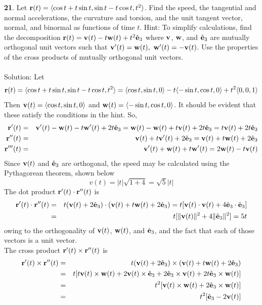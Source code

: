 \documentclass[12pt]{amsbook}
\newcommand{\la}{\langle}
\newcommand{\ra}{\rangle}
\begin{document}
{\small\bf 21}. Let ${\bf r}(t)=\la \cos t+t\sin t,\sin t-t\cos t, t^2 \ra$. Find the speed, the tangential and normal accelerations, the curvature and torsion, and the unit tangent
vector, normal, and binormal as functions of time $t$.
Hint: To simplify calculations, find the decomposition ${\bf r}(t)={\bf v}(t)-t{\bf w}(t)+t^2\hat{\bf e}_3$ where $\bf v$, $\bf w$, and $\hat{\bf e}_3$ are mutually orthogonal unit vectors such that ${\bf v}'(t)={\bf w}(t), \ {\bf w}'(t)=-{\bf v}(t)$. Use the properties of the cross products of mutually orthogonal unit vectors.
\\
\\
{\sc Solution}: Let 
$${\bf r}(t)=\la \cos t+t\sin t,\sin t-t\cos t, t^2 \ra=\la \cos t, \sin t, 0 \ra-t\la -\sin t, \cos t,0 \ra +t^2\la 0,0,1 \ra$$
Then ${\bf v}(t)=\la \cos t, \sin t, 0 \ra$ and ${\bf w}(t)=\la -\sin t, \cos t,0 \ra $. It should be evident that these satisfy the conditions in the hint. So,
\begin{eqnarray*}
{\bf r}'(t)&=&{\bf v}'(t)-{\bf w}(t)-t{\bf w}'(t)+2t\hat{\bf e}_3={\bf w}(t)-{\bf w}(t)+t{\bf v}(t)+2t\hat{\bf e}_3=t{\bf v}(t)+2t\hat{\bf e}_3 \\
{\bf r}''(t)&=&{\bf v}(t)+t{\bf v}'(t)+2\hat{\bf e}_3 ={\bf v}(t)+t{\bf w}(t)+2\hat{\bf e}_3 \\
{\bf r}'''(t)&=&{\bf v}'(t)+{\bf w}(t)+t{\bf w}'(t)=2{\bf w}(t)-t{\bf v}(t)
\end{eqnarray*}
Since ${\bf v}(t)$ and $\hat{\bf e}_3$ are orthogonal, the speed may be calculated using the Pythagorean theorem, shown below
$$v(t)=|t|\sqrt{1+4}=\sqrt{5}|t|$$
The dot product ${\bf r}'(t)\cdot{\bf r}''(t)$ is
\begin{eqnarray*}
{\bf r}'(t)\cdot{\bf r}''(t)&=&t({\bf v}(t)+2\hat{\bf e}_3)\cdot({\bf v}(t)+t{\bf w}(t)+2\hat{\bf e}_3)=t[{\bf v}(t)\cdot{\bf v}(t)+4\hat{\bf e}_3\cdot \hat{\bf e}_3]\\
&=&t[\|{\bf v}(t)\|^2+4\|\hat{\bf e}_3\|^2]=5t
\end{eqnarray*}
owing to the orthogonality of ${\bf v}(t)$, ${\bf w}(t)$, and $\hat{\bf e}_3$, and the fact that each of those vectors is a unit vector. 
\\
The cross product ${\bf r}'(t)\times{\bf r}''(t)$ is
\begin{eqnarray*}
{\bf r}'(t)\times{\bf r}''(t)&=&t({\bf v}(t)+2\hat{\bf e}_3)\times({\bf v}(t)+t{\bf w}(t)+2\hat{\bf e}_3)\\
&=&t[t{\bf v}(t)\times{\bf w}(t)+2{\bf v}(t)\times\hat{\bf e}_3+2\hat{\bf e}_3\times{\bf v}(t)+2t\hat{\bf e}_3\times{\bf w}(t)]\\
&=&t^2[{\bf v}(t)\times{\bf w}(t)+2\hat{\bf e}_3\times{\bf w}(t)] \\
&=&t^2[\hat{\bf e}_3-2{\bf v}(t)] 
\end{eqnarray*}
\end{document}
